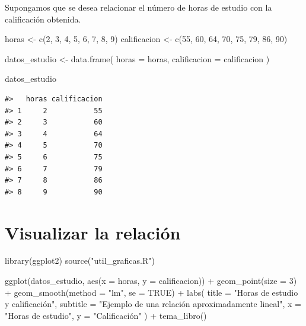 \documentclass[
  spanish,
  10.5pt,
  letterpaper,
  openany,
  headings=big]{scrbook}
\newenvironment{Shaded}{}{}
\newcommand{\AttributeTok}[1]{\textcolor[rgb]{0.84,0.23,0.29}{#1}}
\newcommand{\ConstantTok}[1]{\textcolor[rgb]{0.00,0.36,0.77}{#1}}
\newcommand{\DecValTok}[1]{\textcolor[rgb]{0.00,0.36,0.77}{#1}}
\newcommand{\FunctionTok}[1]{\textcolor[rgb]{0.44,0.26,0.76}{#1}}
\newcommand{\NormalTok}[1]{\textcolor[rgb]{0.14,0.16,0.18}{#1}}
\newcommand{\OtherTok}[1]{\textcolor[rgb]{0.44,0.26,0.76}{#1}}
\newcommand{\SpecialCharTok}[1]{\textcolor[rgb]{0.00,0.36,0.77}{#1}}
\newcommand{\StringTok}[1]{\textcolor[rgb]{0.01,0.18,0.38}{#1}}
\begin{document}
Supongamos que se desea relacionar el número de horas de estudio con la
calificación obtenida.

\begin{Shaded}
\begin{Highlighting}[]
\NormalTok{horas }\OtherTok{\textless{}{-}} \FunctionTok{c}\NormalTok{(}\DecValTok{2}\NormalTok{, }\DecValTok{3}\NormalTok{, }\DecValTok{4}\NormalTok{, }\DecValTok{5}\NormalTok{, }\DecValTok{6}\NormalTok{, }\DecValTok{7}\NormalTok{, }\DecValTok{8}\NormalTok{, }\DecValTok{9}\NormalTok{)}
\NormalTok{calificacion }\OtherTok{\textless{}{-}} \FunctionTok{c}\NormalTok{(}\DecValTok{55}\NormalTok{, }\DecValTok{60}\NormalTok{, }\DecValTok{64}\NormalTok{, }\DecValTok{70}\NormalTok{, }\DecValTok{75}\NormalTok{, }\DecValTok{79}\NormalTok{, }\DecValTok{86}\NormalTok{, }\DecValTok{90}\NormalTok{)}

\NormalTok{datos\_estudio }\OtherTok{\textless{}{-}} \FunctionTok{data.frame}\NormalTok{(}
  \AttributeTok{horas =}\NormalTok{ horas,}
  \AttributeTok{calificacion =}\NormalTok{ calificacion}
\NormalTok{)}

\NormalTok{datos\_estudio}
\end{Highlighting}
\end{Shaded}

\begin{verbatim}
#>   horas calificacion
#> 1     2           55
#> 2     3           60
#> 3     4           64
#> 4     5           70
#> 5     6           75
#> 6     7           79
#> 7     8           86
#> 8     9           90
\end{verbatim}

\section{Visualizar la relación}\label{visualizar-la-relaciuxf3n}

\begin{Shaded}
\begin{Highlighting}[]
\FunctionTok{library}\NormalTok{(ggplot2)}
\FunctionTok{source}\NormalTok{(}\StringTok{"util\_graficas.R"}\NormalTok{)}

\FunctionTok{ggplot}\NormalTok{(datos\_estudio, }\FunctionTok{aes}\NormalTok{(}\AttributeTok{x =}\NormalTok{ horas, }\AttributeTok{y =}\NormalTok{ calificacion)) }\SpecialCharTok{+}
  \FunctionTok{geom\_point}\NormalTok{(}\AttributeTok{size =} \DecValTok{3}\NormalTok{) }\SpecialCharTok{+}
  \FunctionTok{geom\_smooth}\NormalTok{(}\AttributeTok{method =} \StringTok{"lm"}\NormalTok{, }\AttributeTok{se =} \ConstantTok{TRUE}\NormalTok{) }\SpecialCharTok{+}
  \FunctionTok{labs}\NormalTok{(}
    \AttributeTok{title =} \StringTok{"Horas de estudio y calificación"}\NormalTok{,}
    \AttributeTok{subtitle =} \StringTok{"Ejemplo de una relación aproximadamente lineal"}\NormalTok{,}
    \AttributeTok{x =} \StringTok{"Horas de estudio"}\NormalTok{,}
    \AttributeTok{y =} \StringTok{"Calificación"}
\NormalTok{  ) }\SpecialCharTok{+}
  \FunctionTok{tema\_libro}\NormalTok{()}
\end{Highlighting}
\end{Shaded}
\end{document}
